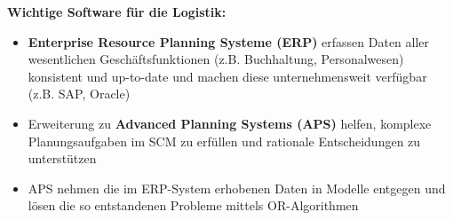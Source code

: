\bigskip
\textbf{Wichtige Software für die Logistik:}
\begin{itemize}
	\item \textbf{Enterprise Resource Planning Systeme (ERP)} erfassen Daten aller wesentlichen Geschäftsfunktionen (z.B. Buchhaltung, Personalwesen) konsistent und up-to-date und machen diese unternehmensweit verfügbar (z.B. SAP, Oracle)
	\item Erweiterung zu \textbf{Advanced Planning Systems (APS)} helfen, komplexe Planungsaufgaben im SCM zu erfüllen und rationale Entscheidungen zu unterstützen
	\item APS nehmen die im ERP-System erhobenen Daten in Modelle entgegen und lösen die so entstandenen Probleme mittels OR-Algorithmen
\end{itemize}